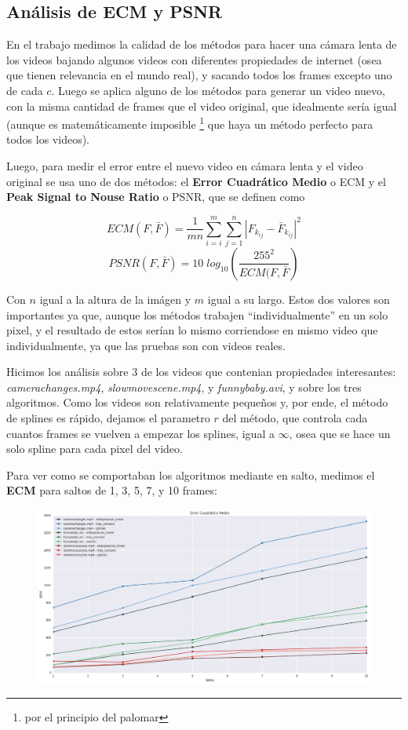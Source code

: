 \subsection {An\'alisis de ECM y PSNR}

En el trabajo medimos la calidad de los m\'etodos para hacer una c\'amara lenta
de los videos bajando algunos videos con diferentes propiedades de internet
(osea que tienen relevancia en el mundo real), y sacando todos los frames
excepto uno de cada $c$. Luego se aplica alguno de los m\'etodos para generar un
video nuevo, con la misma cantidad de frames que el video original, que
idealmente ser\'ia igual (aunque es matem\'aticamente imposible \footnote{por el
principio del palomar} que haya un m\'etodo perfecto para todos los videos).

Luego, para medir el error entre el nuevo video en c\'amara lenta y el video
original se usa uno de dos m\'etodos: el \textbf{Error Cuadr\'atico Medio} o ECM
y el \textbf{Peak Signal to Nouse Ratio} o PSNR, que se definen como

\[
ECM(F, \bar{F}) = \frac{1}{m n} \sum^m_{i = i} \sum^n_{j = 1} \left| F_{k_{i j}} - \bar{F}_{k_{i j}} \right|^2
\]
\[
PSNR(F, \bar{F}) = 10 \; log_{10} \left( \frac{255^2}{ECM(F, \bar{F}} \right)
\]

Con $n$ igual a la altura de la im\'agen y $m$ igual a su largo. Estos dos
valores son importantes ya que, aunque los m\'etodos trabajen
``individualmente'' en un solo pixel, y el resultado de estos ser\'ian lo mismo
corriendose en mismo video que individualmente, ya que las pruebas son con videos
reales.

Hicimos los an\'alisis sobre 3 de los videos que contenian propiedades
interesantes: \textit{camerachanges.mp4}, \textit{slowmovescene.mp4}, y
\textit{funnybaby.avi}, y sobre los tres algoritmos. Como los videos son
relativamente peque\~nos y, por ende, el m\'etodo de splines es r\'apido,
dejamos el parametro $r$ del m\'etodo, que controla cada cuantos frames se
vuelven a empezar los splines, igual a $\infty$, osea que se hace un solo spline
para cada pixel del video.

Para ver como se comportaban los algoritmos mediante en salto, medimos el
\textbf{ECM} para saltos de 1, 3, 5, 7, y 10 frames:

\begin{figure}[H]
\centering
\includegraphics[width=.95\textwidth]{graficos/ecm.png}
\end{figure}

